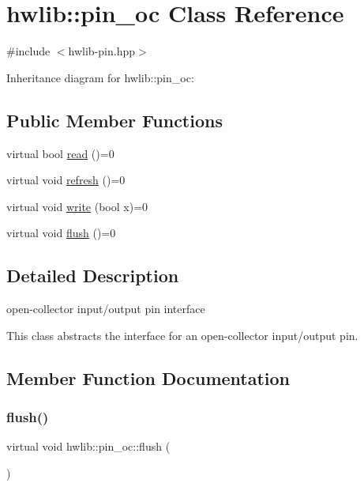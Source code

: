 \hypertarget{classhwlib_1_1pin__oc}{}\section{hwlib\+:\+:pin\+\_\+oc Class Reference}
\label{classhwlib_1_1pin__oc}


{\ttfamily \#include $<$hwlib-\/pin.\+hpp$>$}



Inheritance diagram for hwlib\+:\+:pin\+\_\+oc\+:
\subsection*{Public Member Functions}
\begin{DoxyCompactItemize}
\item 
virtual bool \hyperlink{classhwlib_1_1pin__oc_a51180afd605add59b96105fa98e29f88}{read} ()=0
\item 
virtual void \hyperlink{classhwlib_1_1pin__oc_a573740f6f790c5792efc9cdd44cc73b3}{refresh} ()=0
\item 
virtual void \hyperlink{classhwlib_1_1pin__oc_a4429dd7dc80858a213bb157f4ac5def3}{write} (bool x)=0
\item 
virtual void \hyperlink{classhwlib_1_1pin__oc_a021036a4566c712e43250ddd28a85e54}{flush} ()=0
\end{DoxyCompactItemize}


\subsection{Detailed Description}
open-\/collector input/output pin interface

This class abstracts the interface for an open-\/collector input/output pin. 

\subsection{Member Function Documentation}
\mbox{\label{classhwlib_1_1pin__oc_a021036a4566c712e43250ddd28a85e54}} 
\subsubsection{\texorpdfstring{flush()}{flush()}}
{\footnotesize\ttfamily virtual void hwlib\+::pin\+\_\+oc\+::flush (\begin{DoxyParamCaption}{ }\end{DoxyParamCaption})\hspace{0.3cm}{\ttfamily [pure virtual]}}





